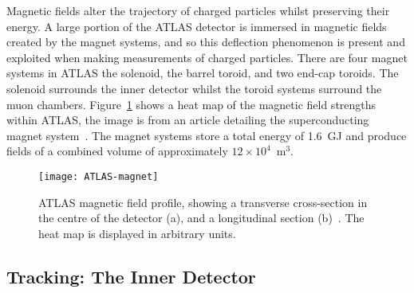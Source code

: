 Magnetic fields alter the trajectory of charged particles whilst preserving
their energy. A large portion of the ATLAS detector is immersed in magnetic
fields created by the magnet systems, and so this deflection phenomenon is
present and exploited when making measurements of charged particles. There are
four magnet systems in ATLAS the solenoid, the barrel toroid, and two end-cap
toroids. The solenoid surrounds the inner detector whilst the toroid systems
surround the muon chambers. Figure~\ref{fig:ATLAS-magnets} shows a heat map of
the magnetic field strengths within ATLAS, the image is from an article
detailing the superconducting magnet system~\cite{ATLAS-magnets}. The magnet
systems store a total energy of 1.6~GJ and produce fields of a combined volume
of approximately $12\times 10^4$~m$^3$.
\begin{figure}[ht] \centering \texttt{[image: ATLAS-magnet]}
  \caption[ATLAS magnetic field]{ATLAS magnetic field profile, showing a
transverse cross-section in the centre of the detector (a), and a longitudinal
section (b)~\cite{ATLAS-magnets}. The heat map is displayed in arbitrary
units.}%
  \label{fig:ATLAS-magnets}
\end{figure}

\subsection{Tracking: The Inner Detector}%
\label{sec:id}

